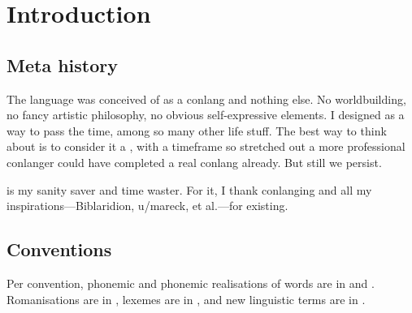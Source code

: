 \chapter{Introduction}
\section{Meta history}
The \langname{} language was conceived of as a conlang and nothing else. No worldbuilding,
no fancy artistic philosophy, no obvious self-expressive elements. I designed \langname{}
as a way to pass the time, among so many other life stuff. The best way to think about
\langname{} is to consider it a , with a timeframe so stretched out a more professional
conlanger could have completed a real conlang already. But still we persist.

\langname{} is my sanity saver and time waster. For it, I thank conlanging and all my
inspirations---Biblaridion, u/mareck, et al.---for existing.

\section{Conventions}
Per convention, phonemic and phonemic realisations of words are in 
and . Romanisations are in , lexemes are in
, and new linguistic terms are in .